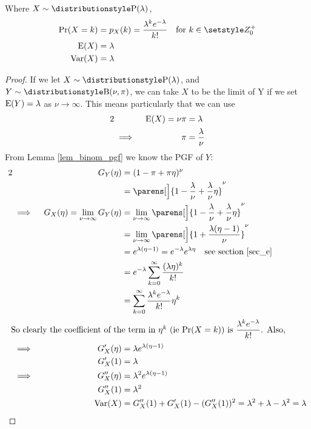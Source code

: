 \begin{theorem}
 Where \(X \sim \Poisson(\lambda)\),
 \begin{align*}
  \Prob(X = k) &= p_X(k) = \frac{\lambda^k e^{-\lambda}}{k!}
      \quad \text{for \(k \in \Integers^+_0\)} \\
  \Expect(X) &= \lambda \\
  \Var(X) &= \lambda
 \end{align*}
\end{theorem}
\begin{proof}
 If we let \(X \sim \Poisson(\lambda)\), and \(Y \sim \Binomial(\nu, \pi)\),
 we can take \(X\) to be the limit of Y if we set \(\operatorname{E}(Y) = \lambda\)
 as \(\nu \to \infty\). This means particularly that we can use
 \begin{alignat*}2
  && \Expect(X) = \nu \pi &= \lambda \\
  &\implies{}& \pi &= \frac \lambda \nu
 \end{alignat*}
 From Lemma \ref{lem_binom_pgf} we know the PGF of \(Y\):
 \begin{alignat*}2
  && G_Y(\eta) &= (1 - \pi + \pi \eta)^\nu \\
  &&  &= \parens[\Big]{1 - \frac \lambda \nu + \frac \lambda \nu \eta}^\nu \\
  &\implies{}& G_X(\eta) = \lim_{\nu \to \infty}G_Y(\eta)
      &= \lim_{\nu \to \infty} \parens[\Big]{1 - \frac \lambda \nu
                                  + \frac \lambda \nu \eta}^\nu \\
  &&  &= \lim_{\nu \to \infty} \parens[\Big]
      {1 + \frac{\lambda(\eta - 1)}\nu}^\nu \\
  &&  &= e^{\lambda(\eta - 1)} = e^{-\lambda}e^{\lambda \eta}
      \quad \text{see section \ref{sec_e}} \\
  &&  &= e^{-\lambda} \sum_{k = 0}^\infty \frac{(\lambda \eta)^k}{k!} \\
  &&  &= \sum_{k = 0}^\infty \frac{\lambda ^k e^{-\lambda}}{k!} \eta^k \\
  \intertext{
  So clearly the coefficient of the term in \(\eta^k\) (ie \(\Prob(X = k)\))
  is \(\dfrac{\lambda^k e^{-\lambda}}{k!}\). Also,}
  &\implies{}& G_X'(\eta) &= \lambda e^{\lambda(\eta - 1)} \\
  && G_X'(1) &= \lambda \\
  &\implies{}& G_X''(\eta) &= \lambda^2 e^{\lambda(\eta - 1)} \\
  && G_X''(1) &= \lambda^2 \\
  && \Var(X) &= G_X''(1) + G_X'(1) - (G_X''(1))^2
      = \lambda^2 + \lambda - \lambda^2 = \lambda \qedhere
 \end{alignat*}
\end{proof}

